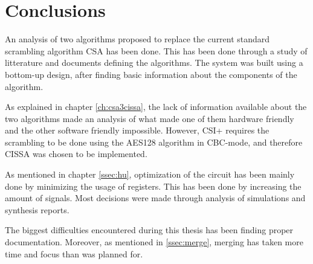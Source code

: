 
\section{Conclusions}
An analysis of two algorithms proposed to replace the current standard 
scrambling algorithm CSA has been done. This has been done through 
a study of litterature and documents defining the algorithms. The 
system was built using a bottom-up design, after finding basic 
information about the components of the algorithm.

As explained in chapter \ref{ch:csa3cissa}, the lack of information 
available about the two algorithms made an analysis of what made one 
of them hardware friendly and the other software friendly impossible. 
However, CSI+ requires the scrambling to be done using the AES128 
algorithm in CBC-mode, and therefore CISSA was chosen to be 
implemented.

As mentioned in chapter \ref{ssec:hu}, optimization of the circuit has 
been mainly done by minimizing the usage of registers. This has been 
done by increasing the amount of signals. Most decisions were made 
through analysis of simulations and synthesis reports.

The biggest difficulties encountered during this thesis has been 
finding proper documentation. Moreover, as mentioned in 
\ref{ssec:merge}, merging has taken more time and focus than was 
planned for.
